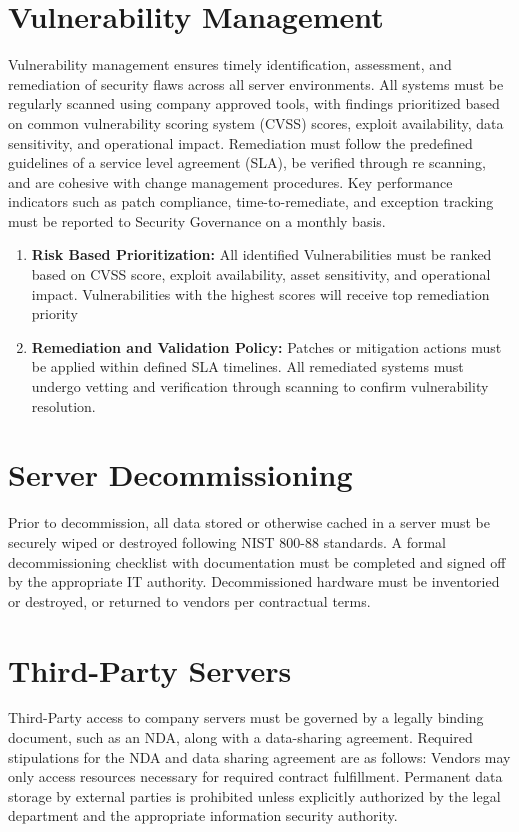 \section{Vulnerability Management}
Vulnerability management ensures timely identification, assessment, and remediation of security flaws across all server environments. All systems must be regularly scanned using company approved tools, with findings prioritized based on common vulnerability scoring system (CVSS) scores, exploit availability, data sensitivity, and operational impact. Remediation must follow the predefined guidelines of a service level agreement (SLA), be verified through re scanning, and are cohesive with change management procedures. Key performance indicators such as patch compliance, time-to-remediate, and exception tracking must be reported to Security Governance on a monthly basis.
\begin{enumerate}
    \item \textbf{Risk Based Prioritization:}
    All identified Vulnerabilities must be ranked based on CVSS score, exploit availability, asset sensitivity, and operational impact. Vulnerabilities with the highest scores will receive top remediation priority
    \item \textbf{Remediation and Validation Policy:}
    Patches or mitigation actions must be applied within defined SLA timelines. All remediated systems must undergo vetting and verification through scanning to confirm vulnerability resolution.
\end{enumerate}
\section{Server Decommissioning}
Prior to decommission, all data stored or otherwise cached in a server must be securely wiped or destroyed following NIST 800-88 standards. A formal decommissioning checklist with documentation must be completed and signed off by the appropriate IT authority. Decommissioned hardware must be inventoried or destroyed, or returned to vendors per contractual terms.

\section{Third-Party Servers}
Third-Party access to company servers must be governed by a legally binding document, such as an NDA, along with a data-sharing agreement. Required stipulations for the NDA and data sharing agreement are as follows: Vendors may only access resources necessary for required contract fulfillment. Permanent data storage by external parties is prohibited unless explicitly authorized by the legal department and the appropriate information security authority.

